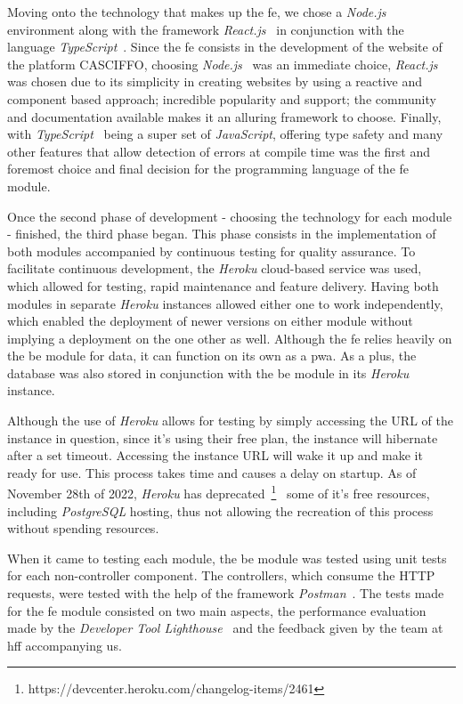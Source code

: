 Moving onto the technology that makes up the \acrshort{fe}, we chose a \textit{Node.js}~\cite{nodejs} environment along with the framework \textit{React.js}~\cite{reactjs} in conjunction with the language \textit{TypeScript}~\cite{typescript}. 
Since the \acrshort{fe} consists in the development of the website of the platform CASCIFFO, choosing \textit{Node.js}~\cite{nodejs} was an immediate choice, \textit{React.js}~\cite{reactjs} was chosen due to its simplicity in creating websites by using a reactive and component based approach; incredible popularity and support; the community and documentation available makes it an alluring framework to choose. Finally, with \textit{TypeScript}~\cite{typescript} being a super set of \textit{JavaScript}, offering type safety and many other features that allow detection of errors at compile time was the first and foremost choice and final decision for the programming language of the \acrshort{fe} module. 

Once the second phase of development - choosing the technology for each module - finished, the third phase began. This phase consists in the implementation of both modules accompanied by continuous testing for quality assurance. To facilitate continuous development, the \textit{Heroku} cloud-based service was used, which allowed for testing, rapid maintenance and feature delivery. 
Having both modules in separate \textit{Heroku} instances allowed either one to work independently, which enabled the deployment of newer versions on either module without implying a deployment on the one other as well. Although the \acrshort{fe} relies heavily on the \acrshort{be} module for data, it can function on its own as a \acrfull{pwa}. 
As a plus, the database was also stored in conjunction with the \acrshort{be} module in its \textit{Heroku} instance. 

Although the use of \textit{Heroku} allows for testing by simply accessing the URL of the instance in question, since it's using their free plan, the instance will hibernate after a set timeout. Accessing the instance URL will wake it up and make it ready for use. This process takes time and causes a delay on startup. As of November 28th of 2022, \textit{Heroku} has deprecated~\footnote{https://devcenter.heroku.com/changelog-items/2461}~\label{fn:heroku-rip} some of it's free resources, including \textit{PostgreSQL} hosting, thus not allowing the recreation of this process without spending resources.  

When it came to testing each module, the \acrshort{be} module was tested using unit tests for each non-controller component. The controllers, which consume the HTTP requests, were tested with the help of the framework \textit{Postman}~\cite{postman}. The tests made for the \acrshort{fe} module consisted on two main aspects, the performance evaluation made by the \textit{Developer Tool Lighthouse}~\cite{lighthouse} and the feedback given by the team at \acrshort{hff} accompanying us.

